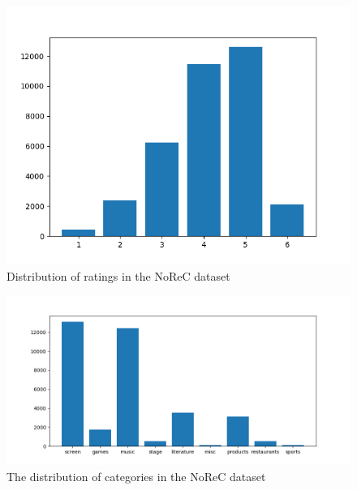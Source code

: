 \documentclass{report}
\begin{document}
\begin{figure}[h!]
	\centering
	\includegraphics[scale=0.5]{img/ratings}
	\caption{Distribution of ratings in the NoReC dataset}
	\label{fig:ratings}
\end{figure}%
\begin{figure}[h!]
		\centering
		\includegraphics[scale=0.5]{img/cat_dist}
		\caption{The distribution of categories in the NoReC dataset}
		\label{fig:cat_dist}
	\end{figure}%
\end{document}
